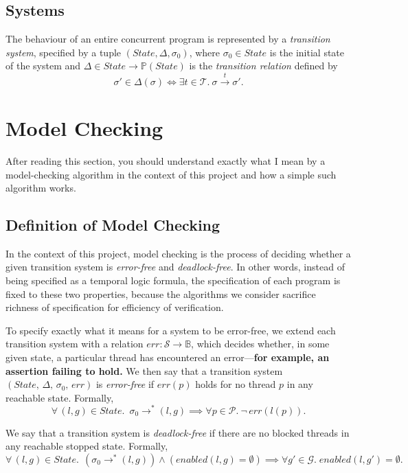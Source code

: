 \documentclass[12pt,a4paper,twoside,openright]{report}
\begin{document}
\subsection{Systems}
The behaviour of an entire concurrent program is represented by a
\emph{transition system},
specified by a tuple $(\textit{State}, \Delta, \sigma_0)$,
where $\sigma_0 \in \textit{State}$ is the initial state of the system and
$\Delta \in State \to \mathbb{P}(State)$
is the \emph{transition relation} defined by
\[
	\sigma' \in \Delta(\sigma) \iff
	\exists t \in \mathcal{T}. \ \sigma \xrightarrow{t} \sigma'.
\]

\section{Model Checking}
After reading this section, you should
understand exactly what I mean by a
model-checking algorithm in the context
of this project and how a simple
such algorithm works.

\subsection{Definition of Model Checking}
\label{sec:model-checking-dfn}
In the context of this project,
model checking is the process of deciding
whether a
given transition system is \emph{error-free} and
\emph{deadlock-free}. In other words, instead of
being specified as a temporal logic formula,
the specification of each program is fixed
to these two properties, because the algorithms we
consider sacrifice richness of specification
for efficiency of verification.

To specify exactly what it means for a system to
be error-free, we extend each transition system
with a relation
$\textit{err} : \mathcal{S} \to \mathbb{B}$, which decides
whether, in some given state, a particular
thread has encountered an error---\textbf{for example,
an assertion failing to hold.}
We then say that a transition system
$(\textit{State},\, \Delta,\, \sigma_0,\, \textit{err})$
is
\emph{error-free} if
$\textit{err}(p)$ holds for no
thread $p$ in any reachable state.
Formally,
\[
	\forall\, (l, g) \in \textit{State}.\; \ \sigma_0 \longrightarrow^* (l, g)
	\implies \forall p \in \mathcal{P}.\ \neg\,\textit{err}(l(p)).
\]

We say that a transition system
is \textit{deadlock-free} if
there are no
blocked threads in any reachable
stopped state.
Formally,
\[
	\forall\, (l, g) \in \textit{State}. \;\, (\sigma_0
	 \longrightarrow^* (l, g))
	\wedge (\textit{enabled}(l, g) = \emptyset)
	\implies \forall g' \in \mathcal{G}. \;
		\textit{enabled}(l, g') = \emptyset.
\]
\end{document}
